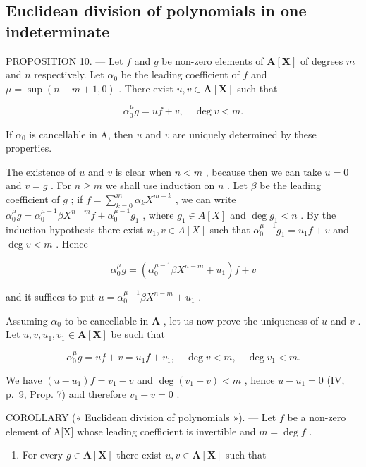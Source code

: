 \subsection{Euclidean division of polynomials in one indeterminate}

PROPOSITION 10. --- Let \(f\) and \(g\) be non-zero elements of \(\mathbf{A}[\mathbf{X}]\) of degrees \(m\) and \(n\) respectively. Let \(\alpha_0\) be the leading coefficient of \(f\) and \(\mu = \sup (n - m + 1, 0)\) . There exist \(u, v \in \mathbf{A}[\mathbf{X}]\) such that

\[
\alpha_ {0} ^ {\mu} g = u f + v, \quad \deg v <   m.
\]

If \(\alpha_0\) is cancellable in A, then \(u\) and \(v\) are uniquely determined by these properties.

The existence of \(u\) and \(v\) is clear when \(n < m\) , because then we can take \(u = 0\) and \(v = g\) . For \(n \geqslant m\) we shall use induction on \(n\) . Let \(\beta\) be the leading coefficient of \(g\) ; if \(f = \sum_{k=0}^{m} \alpha_k X^{m-k}\) , we can write \(\alpha_0^\mu g = \alpha_0^{\mu-1} \beta X^{n-m} f + \alpha_0^{\mu-1} g_1\) , where \(g_1 \in A[X]\) and \(\deg g_1 < n\) . By the induction hypothesis there exist \(u_1, v \in A[X]\) such that \(\alpha_0^{\mu-1} g_1 = u_1 f + v\) and \(\deg v < m\) . Hence

\[
\alpha_ {0} ^ {\mu} g = \left(\alpha_ {0} ^ {\mu - 1} \beta X ^ {n - m} + u _ {1}\right) f + v
\]

and it suffices to put \(u = \alpha_0^{\mu - 1}\beta X^{n - m} + u_1\) .

Assuming \(\alpha_0\) to be cancellable in \(\mathbf{A}\) , let us now prove the uniqueness of \(u\) and \(v\) . Let \(u, v, u_1, v_1 \in \mathbf{A}[\mathbf{X}]\) be such that

\[
\alpha_ {0} ^ {\mu} g = u f + v = u _ {1} f + v _ {1}, \quad \deg v <   m, \quad \deg v _ {1} <   m.
\]

We have \((u - u_{1})f = v_{1} - v\) and \(\deg (v_1 - v) < m\) , hence \(u - u_{1} = 0\) (IV, p.~9, Prop. 7) and therefore \(v_{1} - v = 0\) .

COROLLARY (« Euclidean division of polynomials »). --- Let \(f\) be a non-zero element of A{[}X{]} whose leading coefficient is invertible and \(m = \deg f\) .

\begin{enumerate}
\def\labelenumi{(\roman{enumi})}
\tightlist
\item
  For every \(g \in \mathbf{A}[\mathbf{X}]\) there exist \(u, v \in \mathbf{A}[\mathbf{X}]\) such that
\end{enumerate}

